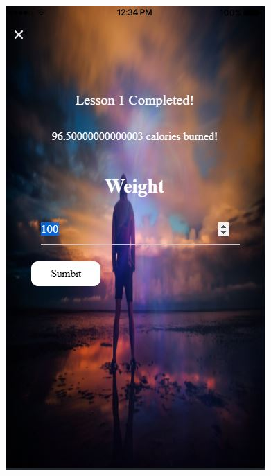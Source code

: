 \documentclass[a4paper,12pt]{article}
\begin{document}
\begin{figure}[!htb]
				  \includegraphics[width=\linewidth]{lesson4}
				\endminipage\hfill

\end{figure}
\end{document}
